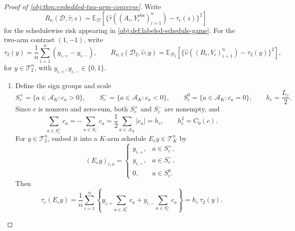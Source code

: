 \documentclass[11pt]{article}
\begin{document}
\begin{proof}[Proof of \cref{obj:thm:embedded-two-arm-converse}]
Write
\[
R_n(\mathcal D,\widehat\tau;z)
=
\mathbb E_{\mathcal D}\!\left[
\{\widehat\tau((A_i,Y_i^{\mathrm{obs}})_{i=1}^n)-\tau_c(z)\}^2
\right]
\]
for the schedulewise risk appearing in \cref{obj:def:labeled-schedule-game}. For the two-arm contrast \((1,-1)\), write
\[
\tau_2(y)=\frac1n\sum_{i=1}^n(y_{i,+}-y_{i,-}),
\qquad
R_{n,2}(\mathcal D_2,\widehat\upsilon;y)
=
\mathbb E_{\mathcal D_2}\!\left[
\{\widehat\upsilon((B_i,V_i)_{i=1}^n)-\tau_2(y)\}^2
\right],
\]
for \(y\in\mathcal T_2^n\), with \(y_{i,+},y_{i,-}\in\{0,1\}\).

\begin{enumerate}
\item Define the sign groups and scale
\[
S_c^+=\{a\in\mathcal A_K:c_a>0\},\qquad
S_c^-=\{a\in\mathcal A_K:c_a<0\},\qquad
S_c^0=\{a\in\mathcal A_K:c_a=0\},
\qquad
h_c=\frac{L_c}{2}.
\]
Since \(c\) is nonzero and zero-sum, both \(S_c^+\) and \(S_c^-\) are nonempty, and
\[
\sum_{a\in S_c^+}c_a
=
-\sum_{a\in S_c^-}c_a
=
\frac12\sum_{a\in\mathcal A_K}|c_a|
=
h_c,
\qquad
h_c^2=C_0(c).
\]
For \(y\in\mathcal T_2^n\), embed it into a \(K\)-arm schedule \(E_cy\in\mathcal T_K^n\) by
\[
(E_cy)_{i,a}
=
\begin{cases}
y_{i,+},&a\in S_c^+,\\
y_{i,-},&a\in S_c^-,\\
0,&a\in S_c^0.
\end{cases}
\]
Then
\[
\tau_c(E_cy)
=
\frac1n\sum_{i=1}^n
\left\{
y_{i,+}\sum_{a\in S_c^+}c_a+
y_{i,-}\sum_{a\in S_c^-}c_a
\right\}
=
h_c\,\tau_2(y).
\]


\end{enumerate}
\end{proof}
\end{document}
